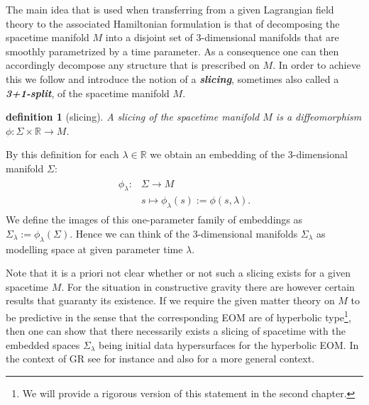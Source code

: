 \documentclass[a4paper,12pt, DIV=14, BCOR=5mm, twoside, headsepline]{scrbook}
\newtheorem{definition}{definition}[section]
\begin{document}
The main idea that is used when transferring from a given Lagrangian field theory to the associated Hamiltonian formulation is that of decomposing the spacetime manifold $M$ into a disjoint set of 3-dimensional manifolds that are smoothly parametrized by a time parameter. As a consequence one can then accordingly decompose any structure that is prescribed on $M$. In order to achieve this we follow \cite{2004math.ph..11032G} and introduce the notion of a \textit{\textbf{slicing}}, sometimes also called a \textit{\textbf{3+1-split}}, of the spacetime manifold $M$.
\begin{definition}[slicing]
A slicing of the spacetime manifold $M$ is a diffeomorphism $\phi : \Sigma \times \mathbb{R} \rightarrow M$.
\end{definition}
By this definition for each $\lambda \in \mathbb{R}$ we obtain an embedding of the 3-dimensional manifold $\Sigma$:
\begin{align}
\begin{aligned}
\phi_{\lambda}: &\Sigma \longrightarrow M \\
&s \longmapsto \phi_{\lambda}(s) := \phi(s,\lambda).
\end{aligned}
\end{align}
We define the images of this one-parameter family of embeddings as $\Sigma_{\lambda} := \phi_{\lambda}(\Sigma)$. Hence we can think of the 3-dimensional manifolds $\Sigma_{\lambda}$ as modelling space at given parameter time $\lambda$.

Note that it is a priori not clear whether or not such a slicing exists for a given spacetime $M$. For the situation in constructive gravity there are however certain results that guaranty its existence. If we require the given matter theory on $M$ to be predictive in the sense that the corresponding EOM are of hyperbolic type\footnote{We will provide a rigorous version of this statement in the second chapter. }, then one can show that there necessarily exists a slicing of spacetime with the embedded spaces $\Sigma_{\lambda}$ being initial data hypersurfaces for the hyperbolic EOM. In the context of GR see for instance \cite{2003CMaPh.243..461B} and also \cite{1996gere.conf...19G} for a more general context. \\
%
%
%
%
%
\end{document}
